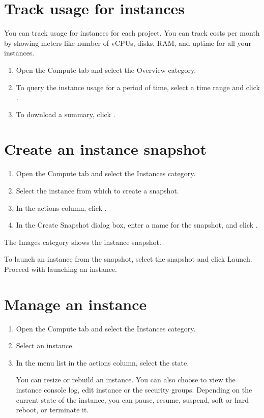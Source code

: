 \section{Track usage for instances}\label{track-usage-for-instances}

You can track usage for instances for each project. You can track costs
per month by showing meters like number of vCPUs, disks, RAM, and uptime
for all your instances.

\begin{enumerate}
\item Open the Compute tab and select the Overview category.
\item To query the instance usage for a period of time, select a time
  range and click .
\item To download a summary, click .
\end{enumerate}

\section{Create an instance snapshot}\label{create-an-instance-snapshot}

\begin{enumerate}
\item Open the Compute tab and select the Instances category.
\item Select the instance from which to create a snapshot.
\item In the actions column, click .
\item In the Create Snapshot dialog box, enter a name for the snapshot, and
  click .
\end{enumerate}

The Images category shows the instance snapshot.

To launch an instance from the snapshot, select the snapshot and click
Launch. Proceed with launching an instance.

\section{Manage an instance}\label{manage-an-instance}

\begin{enumerate}
\item Open the Compute tab and select the Instances category.
\item Select an instance.
\item In the menu list in the actions column, select the state.

  You can resize or rebuild an instance. You can also choose to view
  the instance console log, edit instance or the security
  groups. Depending on the current state of the instance, you can
  pause, resume, suspend, soft or hard reboot, or terminate it.
\end{enumerate}

